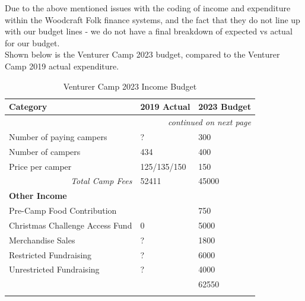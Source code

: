 Due to the above mentioned issues with the coding of income and expenditure within the Woodcraft Folk finance systems, and the fact that they do not line up with our budget lines - we do not have a final breakdown of expected vs actual for our budget.\\

Shown below is the Venturer Camp 2023 budget, compared to the Venturer Camp 2019 actual expenditure. 

{\RaggedRight \centering
    \begin{longtable}{p{} p{} p{}}
    \textbf{Category} & \textbf{2019 Actual} & \textbf{2023 Budget}\\
    \hline
    \hline
    \endhead

    \multicolumn{3}{r}{\footnotesize\itshape continued on next page}\\
    \endfoot 

    \endlastfoot

    Number of paying campers & ? & 300\\
    \hline
    Number of campers & 434 & 400\\
    \hline
    Price per camper & 125/135/150 & 150\\
    \hline
    \multicolumn{1}{r}{\textit{Total Camp Fees}} & 52411 & 45000\\
    \hline
    \multicolumn{3}{l}{\textbf{Other Income}}\\
    \hline
    Pre-Camp Food Contribution & & 750\\
    \hline
    Christmas Challenge Access Fund & 0 & 5000\\
    \hline
    Merchandise Sales & ? & 1800\\
    \hline
    Restricted Fundraising & ? & 6000\\
    \hline
    Unrestricted Fundraising & ? & 4000\\
    \hline
    \rowcolor{accent!60}
    \multicolumn{1}{r}{\textit{Total Income}} & & 62550\\
    \hline

    \caption{Venturer Camp 2023 Income Budget}
    \end{longtable}
} %


